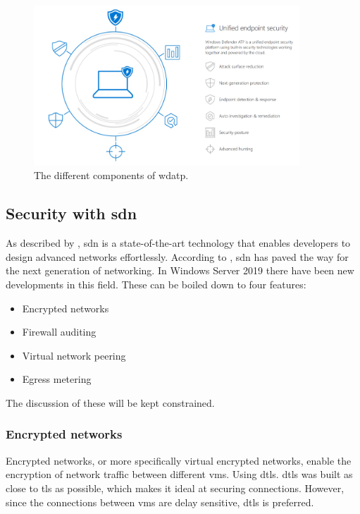 \begin{figure}[hbt!]
	\centering
	\includegraphics[width=\textwidth,height=6cm,keepaspectratio=true]{img/StandVanZaken/WDATP.png}
	\caption[Components of \acrshort{wdatp}]{The different components of \acrfull{wdatp}. \autocite{Aslaner2018}}
	\label{fig:WDATPT2018}
\end{figure}

\subsection{Security with \acrshort{sdn}}
\label{encrypted-networks}
\label{sdn}
As described by \textcite{Shin2016}, \acrshort{sdn} is a state-of-the-art technology that enables developers to design advanced networks effortlessly. 
According to \textcite{Kreutz2015}, \acrshort{sdn} has paved the way for the next generation of networking. 
In Windows Server 2019 there have been new developments in this field. These can be boiled down to four features: 

\begin{itemize}
	\item Encrypted networks
	\item Firewall auditing
	\item Virtual network peering
	\item Egress metering
\end{itemize} 

The discussion of these will be kept constrained.

\subsubsection{Encrypted networks}
Encrypted networks, or more specifically virtual encrypted networks, enable the encryption of network traffic between different \acrshort{vm}s. 
Using \acrfull{dtls}. 
\acrshort{dtls} was built as close to \acrfull{tls} as possible, which makes it ideal at securing connections. 
However, since the connections between \acrshort{vm}s are delay sensitive, \acrshort{dtls} is preferred. \autocite{Modadugu2004}

